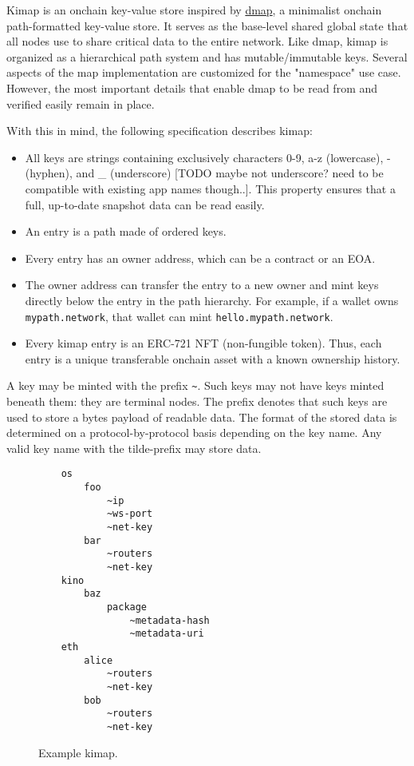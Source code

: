 \documentclass[runningheads]{llncs}
\begin{document}
Kimap is an onchain key-value store inspired by \href{https://github.com/dapphub/dmap}{dmap}, a minimalist onchain path-formatted key-value store.
It serves as the base-level shared global state that all nodes use to share critical data to the entire network.
Like dmap, kimap is organized as a hierarchical path system and has mutable/immutable keys.
Several aspects of the map implementation are customized for the "namespace" use case.
However, the most important details that enable dmap to be read from and verified easily remain in place.

With this in mind, the following specification describes kimap:

\begin{itemize}
    \item All keys are strings containing exclusively characters 0-9, a-z (lowercase), - (hyphen), and \_ (underscore) [TODO maybe not underscore? need to be compatible with existing app names though..].
    This property ensures that a full, up-to-date snapshot data can be read easily.
    \item An entry is a path made of ordered keys.
    \item Every entry has an owner address, which can be a contract or an EOA.
    \item The owner address can transfer the entry to a new owner and mint keys directly below the entry in the path hierarchy. For example, if a wallet owns \verb|mypath.network|, that wallet can mint \verb|hello.mypath.network|.
    \item Every kimap entry is an ERC-721 NFT (non-fungible token).
    Thus, each entry is a unique transferable onchain asset with a known ownership history.
\end{itemize}

A key may be minted with the prefix \verb|~|. Such keys may not have keys minted beneath them: they are terminal nodes. The prefix denotes that such keys are used to store a bytes payload of readable data. The format of the stored data is determined on a protocol-by-protocol basis depending on the key name. Any valid key name with the tilde-prefix may store data.

\begin{figure}
    \centering
    \begin{lstlisting}
    os
        foo
            ~ip
            ~ws-port
            ~net-key
        bar
            ~routers
            ~net-key
    kino
        baz
            package
                ~metadata-hash
                ~metadata-uri
    eth
        alice
            ~routers
            ~net-key
        bob
            ~routers
            ~net-key
    \end{lstlisting}
    \caption{Example kimap.}
    \label{fig:example kimap}
\end{figure}
\end{document}
